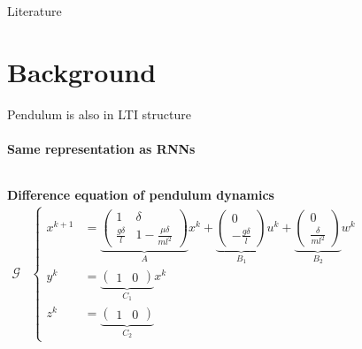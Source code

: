 \documentclass[8pt, t,
aspectratio=169,%
]{beamer}
\begin{document}


\appendix
\begin{frame}[allowframebreaks]{Literature}
    
  
\end{frame}



\section{Background}



\begin{frame}{Pendulum is also in LTI structure}
    \framesubtitle{Same representation as RNNs}
    \vspace{-0.2cm}
    \begin{columns}[T]
        \textbf{Difference equation of pendulum dynamics}
        \begin{align*}
            \mathcal{G} &\left\{ \begin{aligned} 
                x^{k+1} & = 
                \underbrace{\begin{pmatrix}
                    1 & \delta \\
                    \frac{g \delta}{l} & 1 - \frac{\mu \delta}{m l^2}
                \end{pmatrix}}_A
                x^k + 
                \underbrace{\begin{pmatrix}
                    0 \\
                    -\frac{g\delta}{l}
                \end{pmatrix}}_{B_1}
                u^k +
                \underbrace{\begin{pmatrix}
                    0 \\
                    \frac{\delta}{ml^2}
                \end{pmatrix}}_{B_2}
                w^k \\
                y^k & = 
                \underbrace{\begin{pmatrix}
                    1 & 0
                \end{pmatrix}}_{C_1} x^k \\
                z^k & = 
                \underbrace{\begin{pmatrix}
                    1 & 0
                \end{pmatrix}}_{C_2}

\end{aligned}
\end{align*}
\end{columns}
\end{frame}
\end{document}
